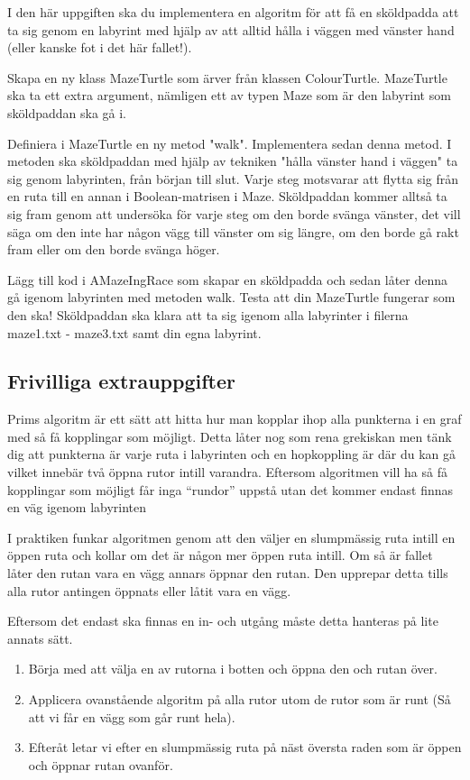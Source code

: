 \Task I den här uppgiften ska du implementera en algoritm för att få en sköldpadda att ta sig genom en labyrint med hjälp av att alltid hålla i väggen med vänster hand (eller kanske fot i det här fallet!).

\Subtask Skapa en ny klass MazeTurtle som ärver från klassen ColourTurtle. MazeTurtle ska ta ett extra argument, nämligen ett av typen Maze som är den labyrint som sköldpaddan ska gå i.

\Subtask Definiera i MazeTurtle en ny metod "walk". Implementera sedan denna metod. I metoden ska sköldpaddan med hjälp av tekniken "hålla vänster hand i väggen" ta sig genom labyrinten, från början till slut. Varje steg motsvarar att flytta sig från en ruta till en annan i Boolean-matrisen i Maze. Sköldpaddan kommer alltså ta sig fram genom att undersöka för varje steg om den borde svänga vänster, det vill säga om den inte har någon vägg till vänster om sig längre, om den borde gå rakt fram eller om den borde svänga höger.

\Subtask Lägg till kod i AMazeIngRace som skapar en sköldpadda och sedan låter denna gå igenom labyrinten med metoden walk. Testa att din MazeTurtle fungerar som den ska! Sköldpaddan ska klara att ta sig igenom alla labyrinter i filerna maze1.txt - maze3.txt samt din egna labyrint.

\subsection{Frivilliga extrauppgifter}
Prims algoritm är ett sätt att hitta hur man kopplar ihop alla punkterna i en graf med så få kopplingar som möjligt. Detta låter nog som rena grekiskan men tänk dig att punkterna är varje ruta i labyrinten och en hopkoppling är där du kan gå vilket innebär två öppna rutor intill varandra. Eftersom algoritmen vill ha så få kopplingar som möjligt får inga ``rundor'' uppstå utan det kommer endast finnas en väg igenom labyrinten

I praktiken funkar algoritmen genom att den väljer en slumpmässig ruta intill en öppen ruta och kollar om det är någon mer öppen ruta intill. Om så är fallet låter den rutan vara en vägg annars öppnar den rutan. Den upprepar detta tills alla rutor antingen öppnats eller låtit vara en vägg.

Eftersom det endast ska finnas en in- och utgång måste detta hanteras på lite annats sätt.
\begin{enumerate}
	\item Börja med att välja en av rutorna i botten och öppna den och rutan över.
	\item Applicera ovanstående algoritm på alla rutor utom de rutor som är runt (Så att vi får en vägg som går runt hela).
	\item Efteråt letar vi efter en slumpmässig ruta på näst översta raden som är öppen och öppnar rutan ovanför.
\end{enumerate}

